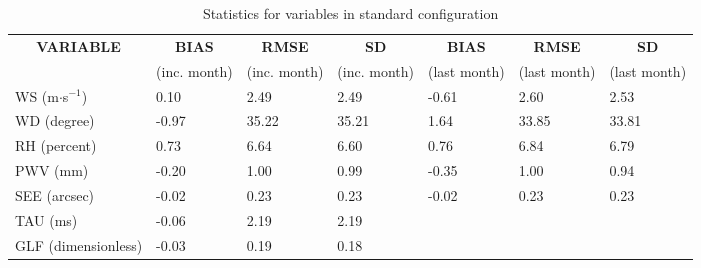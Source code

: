 \documentclass[11pt,english]{article}
\begin{document}
\clearpage
\begin{table}[]
\begin{center}
\begin{tabular}{|l|l|l|l|l|l|l|}
\hline
\multicolumn{1}{|c|}{\cellcolor[HTML]{C0C0C0}\textbf{VARIABLE}} & \multicolumn{1}{c|}{\cellcolor[HTML]{C0C0C0}\textbf{BIAS}} & \multicolumn{1}{c|}{\cellcolor[HTML]{C0C0C0}\textbf{RMSE}} & \multicolumn{1}{c|}{\cellcolor[HTML]{C0C0C0}\textbf{SD}} & \multicolumn{1}{c|}{\cellcolor[HTML]{C0C0C0}\textbf{BIAS}} & \multicolumn{1}{c|}{\cellcolor[HTML]{C0C0C0}\textbf{RMSE}} & \multicolumn{1}{c|}{\cellcolor[HTML]{C0C0C0}\textbf{SD}}\\
\multicolumn{1}{|c|}{\cellcolor[HTML]{C0C0C0}} & \multicolumn{1}{c|}{\cellcolor[HTML]{C0C0C0}(inc. month)} & \multicolumn{1}{c|}{\cellcolor[HTML]{C0C0C0}(inc. month)} & \multicolumn{1}{c|}{\cellcolor[HTML]{C0C0C0}(inc. month)} & \multicolumn{1}{c|}{\cellcolor[HTML]{C0C0C0}(last month)} & \multicolumn{1}{c|}{\cellcolor[HTML]{C0C0C0}(last month)} & \multicolumn{1}{c|}{\cellcolor[HTML]{C0C0C0}(last month)}\\\hline
\cellcolor[HTML]{C0C0C0}WS (m$\cdot$s$^{-1}$) &      0.10  &      2.49  &      2.49  &     -0.61     &      2.60     &      2.53\\
\cellcolor[HTML]{C0C0C0}WD (degree)           &     -0.97  &     35.22  &     35.21  &      1.64     &     33.85     &     33.81\\
\cellcolor[HTML]{C0C0C0}RH (percent)          &      0.73  &      6.64  &      6.60  &      0.76     &      6.84     &      6.79\\
\cellcolor[HTML]{C0C0C0}PWV (mm)              &     -0.20 &      1.00 &      0.99 &     -0.35    &      1.00    &      0.94\\
\cellcolor[HTML]{C0C0C0}SEE (arcsec)          &     -0.02 &      0.23 &      0.23 &     -0.02    &      0.23    &      0.23\\
\cellcolor[HTML]{C0C0C0}TAU (ms)              &     -0.06 &      2.19 &      2.19 &     &     & \\
\cellcolor[HTML]{C0C0C0}GLF (dimensionless)   &     -0.03 &      0.19 &      0.18 &     &     & \\
\hline
\end{tabular}
\caption{Statistics for variables in standard configuration}
\end{center}
\end{table}
\end{document}
